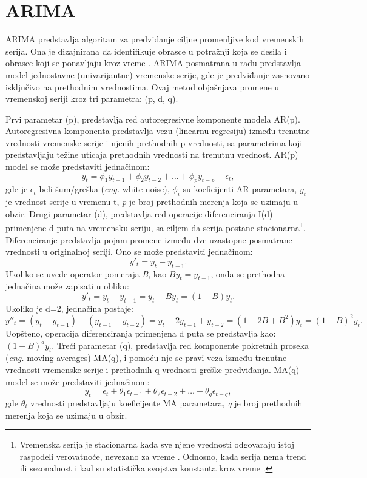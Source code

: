 \documentclass[12pt,oneside]{memoir}
\begin{document}
\section{ARIMA}
ARIMA predstavlja algoritam za predviđanje ciljne promenljive kod vremenskih serija. Ona je dizajnirana da identifikuje obrasce u potražnji koja se desila i obrasce koji se ponavljaju kroz vreme \cite{moon2018demand}. ARIMA posmatrana u radu predstavlja model jednostavne (univarijantne) vremenske serije, gde je predviđanje zasnovano isključivo na prethodnim vrednostima. Ovaj metod objašnjava promene u vremenskoj seriji kroz tri parametra: (p, d, q). 

Prvi parametar (p), predstavlja red autoregresivne komponente modela AR(p). Autoregresivna komponenta predstavlja vezu (linearnu regresiju) između trenutne vrednosti vremenske serije i njenih prethodnih p-vrednosti, sa parametrima koji predstavljaju težine uticaja prethodnih vrednosti na trenutnu vrednost. AR(p) model se može predstaviti jednačinom: 
$$ y_t = \phi_1y_{t-1} + \phi_2y_{t-2} + \dots + \phi_py_{t-p} + \epsilon_t,$$ gde je $\epsilon_t$ beli šum/greška (\textit{eng.} white noise), $\phi_i$ su koeficijenti AR parametara, $y_t$ je vrednost serije u vremenu t, \textit{p} je broj prethodnih merenja koja se uzimaju u obzir.
Drugi parametar (d), predstavlja red operacije diferenciranja I(d) primenjene d puta na vremensku seriju, sa ciljem da serija postane stacionarna\footnote{Vremenska serija je stacionarna kada sve njene vrednosti odgovaraju istoj raspodeli verovatnoće, nevezano za vreme \cite{vargas2017automobile}. Odnosno, kada serija nema trend ili sezonalnost i kad su statistička svojstva konstanta kroz vreme \cite{saravanan2019forecasting}.}. Diferenciranje predstavlja pojam promene između dve uzastopne posmatrane vrednosti u originalnoj seriji. Ono se može predstaviti jednačinom:
$$y'_t = y_t - y_{t-1}.$$
Ukoliko se uvede operator pomeraja \textit{B}, kao $By_t=y_{t-1}$, onda se prethodna jednačina može zapisati u obliku:
$$y'_t = y_t - y_{t-1} = y_t - By_t = (1-B)y_t.$$
Ukoliko je d=2, jednačina postaje:
$$y''_t = (y_t-y_{t-1}) - (y_{t-1}-y_{t-2}) = y_t - 2y_{t-1} + y_{t-2} = (1-2B+B^2)y_t = (1-B)^2y_t.$$
Uopšteno, operacija diferenciranja primenjena d puta se predstavlja kao: $(1-B)^{d}y_t$. 
Treći parametar (q), predstavlja red komponente pokretnih proseka (\textit{eng.} moving averages) MA(q), i pomoću nje se pravi veza između trenutne vrednosti vremenske serije i prethodnih q vrednosti greške predviđanja. MA(q) model se može predstaviti jednačinom:
$$y_t = \epsilon_t + \theta_1\epsilon_{t-1} + \theta_2\epsilon_{t-2} + \dots + \theta_q\epsilon_{t-q}, $$
gde $\theta_i$ vrednosti predstavljaju koeficijente MA parametara, \textit{q} je broj prethodnih merenja koja se uzimaju u obzir.
\end{document}
